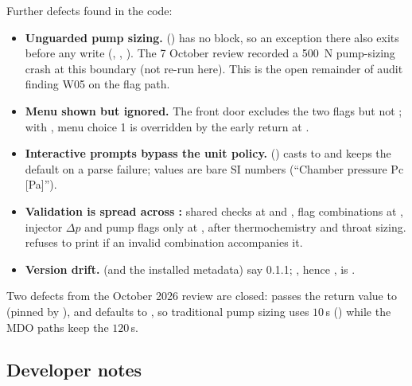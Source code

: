 Further defects found in the code:
\begin{itemize}
  \item \textbf{Unguarded pump sizing.}  () has no  block, so an exception there also exits before any  write (, , ). The 7 October review recorded a 500~N pump-sizing crash at this boundary (not re-run here). This is the open remainder of audit finding W05 on the flag path.
  \item \textbf{Menu shown but ignored.} The front door excludes the two  flags but not ; with  , menu choice 1 is overridden by the early return at .
  \item \textbf{Interactive prompts bypass the unit policy.}  () casts to  and keeps the default on a parse failure; values are bare SI numbers (``Chamber pressure Pc [Pa]'').
  \item \textbf{Validation is spread across :} shared checks at  and , flag combinations at , injector $\Delta p$ and pump flags only at , after thermochemistry and throat sizing.  refuses to print if an invalid combination accompanies it.
  \item \textbf{Version drift.}  (and the installed metadata) say 0.1.1; , hence , is .
\end{itemize}

Two defects from the October 2026 review are closed:  passes the return value to  (pinned by ), and  defaults to , so traditional pump sizing uses $10\,$s () while the MDO paths keep the  $120\,$s.

\subsection{Developer notes}\label{sec:s01-dev}

